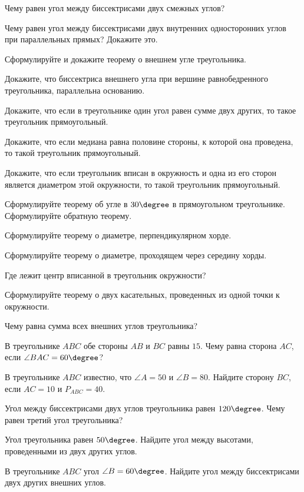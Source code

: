 \begin{listofex}
	\item Чему равен угол между биссектрисами двух смежных углов?
	\item Чему равен угол между биссектрисами двух внутренних односторонних углов при параллельных прямых? Докажите это.
	\item Сформулируйте и докажите теорему о внешнем угле треугольника.
	\item Докажите, что биссектриса внешнего угла при вершине равнобедренного треугольника, параллельна основанию.
	\item Докажите, что если в треугольнике один угол равен сумме двух других, то такое треугольник прямоугольный.
	\item Докажите, что если медиана равна половине стороны, к которой она проведена, то такой треугольник прямоугольный.
	\item Докажите, что если треугольник вписан в окружность и одна из его сторон является диаметром этой окружности, то такой треугольник прямоугольный.
	\item Сформулируйте теорему об угле в \( 30\degree \) в прямоугольном треугольнике. Сформулируйте обратную теорему.
	\item Сформулируйте теорему о диаметре, перпендикулярном хорде.
	\item Сформулируйте теорему о диаметре, проходящем через середину хорды.
	\item Где лежит центр вписанной в треугольник окружности?
	\item Сформулируйте теорему о двух касательных, проведенных из одной точки к окружности.
	\item Чему равна сумма всех внешних углов треугольника?
	\item В треугольнике \( ABC \) обе стороны \( AB \) и \( BC \) равны \( 15 \). Чему равна сторона \( AC \), если \( \angle BAC = 60 \degree \)?
	\item В треугольнике \( ABC \) известно, что \( \angle A = 50 \) и \( \angle B = 80 \). Найдите сторону \( BC \), если \( AC = 10 \) и \( P_{ABC}=40 \).
	\item Угол между биссектрисами двух углов треугольника равен \( 120\degree \). Чему равен третий угол треугольника?
	\item Угол треугольника равен \( 50\degree \). Найдите угол между высотами, проведенными из двух других углов.
	\item В треугольнике \( ABC \) угол \( \angle B=60\degree \). Найдите угол между биссектрисами двух других внешних углов.

\end{listofex}
